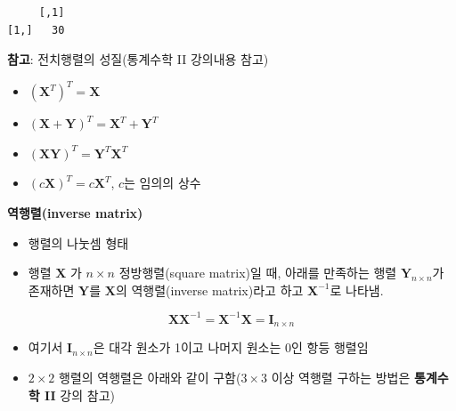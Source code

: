 \documentclass[
  11pt,
]{krantz}
\newenvironment{Shaded}{\begin{snugshade}}{\end{snugshade}}
\newcommand{\CommentTok}[1]{\textcolor[rgb]{0.37,0.37,0.37}{\textit{#1}}}
\newcommand{\KeywordTok}[1]{\textcolor[rgb]{0.27,0.27,0.27}{\textbf{#1}}}
\newcommand{\NormalTok}[1]{#1}
\newcommand{\OperatorTok}[1]{\textcolor[rgb]{0.43,0.43,0.43}{\textbf{#1}}}
\newcommand{\StringTok}[1]{\textcolor[rgb]{0.5,0.5,0.5}{#1}}
\providecommand{\tightlist}{%
  \setlength{\itemsep}{0pt}\setlength{\parskip}{0pt}}
\let\BeginKnitrBlock\begin \let\EndKnitrBlock\end
\begin{document}
\begin{Shaded}
\end{Shaded}

\begin{verbatim}
     [,1]
[1,]   30
\end{verbatim}

\normalsize

\footnotesize

\BeginKnitrBlock{rmdtip}
\textbf{참고}: 전치행렬의 성질(통계수학 II 강의내용 참고)

\begin{itemize}
\tightlist
\item
  \((\mathrm{\mathbf{X}}^T)^T = \mathrm{\mathbf{X}}\)
\item
  \((\mathrm{\mathbf{X} + \mathbf{Y}})^T = \mathrm{\mathbf{X}}^T + \mathrm{\mathbf{Y}}^T\)
\item
  \((\mathrm{\mathbf{X}\mathbf{Y}})^T = \mathrm{\mathbf{Y}}^T\mathrm{\mathbf{X}}^T\)
\item
  \((c\mathrm{\mathbf{X}})^T = c\mathrm{\mathbf{X}}^T\), \(c\)는 임의의 상수
\end{itemize}
\EndKnitrBlock{rmdtip}

\normalsize

\textbf{역행렬(inverse matrix)}

\begin{itemize}
\tightlist
\item
  행렬의 나눗셈 형태
\item
  행렬 \(\mathrm{\mathbf{X}}\) 가 \(n \times n\) 정방행렬(square matrix)일 때, 아래를 만족하는 행렬 \(\mathrm{\mathbf{Y}}_{n \times n}\)가 존재하면 \(\mathrm{\mathbf{Y}}\)를 \(\mathrm{\mathbf{X}}\)의 역행렬(inverse matrix)라고 하고 \(\mathrm{\mathbf{X}}^{-1}\)로 나타냄.
\end{itemize}

\[
 \mathrm{\mathbf{X}\mathbf{X}^{-1}} = \mathrm{\mathbf{X}^{-1}\mathbf{X}} = \mathrm{\mathbf{I}}_{n\times n}
\]

\begin{itemize}
\tightlist
\item
  여기서 \(\mathrm{\mathbf{I}}_{n\times n}\)은 대각 원소가 1이고 나머지 원소는 0인 항등 행렬임
\item
  \(2 \times 2\) 행렬의 역행렬은 아래와 같이 구함(\(3\times 3\) 이상 역행렬 구하는 방법은 \textbf{통계수학 II} 강의 참고)
\end{itemize}
\end{document}
